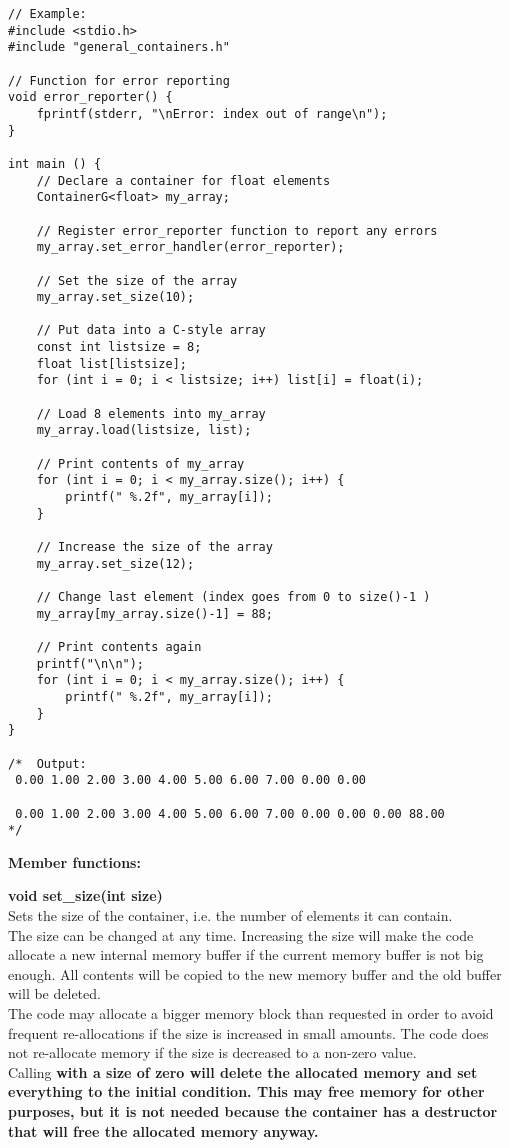 \documentclass[11pt,a4paper,oneside,openright]{report}
\newcommand{\vspacebig}{\vspace{6mm}}
\newcommand{\codei}[1]{\bfseries \ttfamily{#1}\normalfont}
\begin{document}
\begin{lstlisting}[frame=none]
// Example:
#include <stdio.h>
#include "general_containers.h"

// Function for error reporting
void error_reporter() {
    fprintf(stderr, "\nError: index out of range\n");
}

int main () {
    // Declare a container for float elements
    ContainerG<float> my_array;

    // Register error_reporter function to report any errors
    my_array.set_error_handler(error_reporter);

    // Set the size of the array    
    my_array.set_size(10);

    // Put data into a C-style array
    const int listsize = 8;
    float list[listsize];
    for (int i = 0; i < listsize; i++) list[i] = float(i);

    // Load 8 elements into my_array
    my_array.load(listsize, list);

    // Print contents of my_array
    for (int i = 0; i < my_array.size(); i++) {
        printf(" %.2f", my_array[i]);
    }

    // Increase the size of the array    
    my_array.set_size(12);

    // Change last element (index goes from 0 to size()-1 )
    my_array[my_array.size()-1] = 88;

    // Print contents again
    printf("\n\n");
    for (int i = 0; i < my_array.size(); i++) {
        printf(" %.2f", my_array[i]);
    }
}

/*  Output:
 0.00 1.00 2.00 3.00 4.00 5.00 6.00 7.00 0.00 0.00
 
 0.00 1.00 2.00 3.00 4.00 5.00 6.00 7.00 0.00 0.00 0.00 88.00
*/
\end{lstlisting}
\vspacebig

{\bfseries Member functions:}\\
\vspacebig

{\bfseries void set\_size(int size)}\\
Sets the size of the container, i.e. the number of elements it can contain.\\
The size can be changed at any time. Increasing the size will make the code allocate a new internal memory buffer if the current memory buffer is not big enough. All contents will be copied to the new memory buffer and the old buffer will be deleted.\\
The code may allocate a bigger memory block than requested in order to avoid frequent re-allocations if the size is increased in small amounts. 
The code does not re-allocate memory if the size is decreased to a non-zero value.\\
Calling \codei{set\_size} with a size of zero will delete the allocated memory and set everything to the initial condition. This may free memory for other purposes, but it is not needed because the container has a destructor that will free the allocated memory anyway.
\vspacebig
\end{document}

